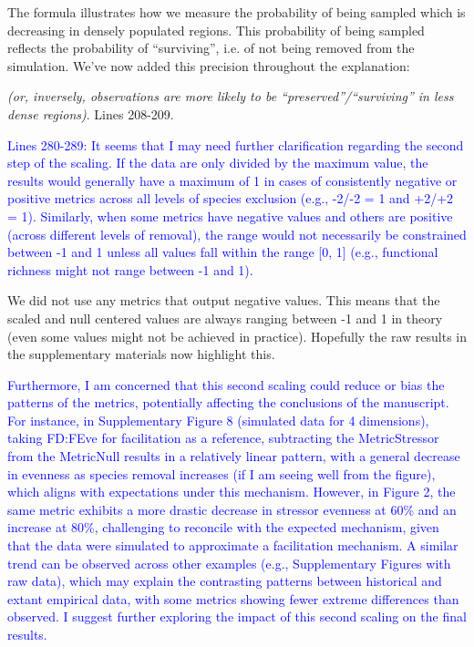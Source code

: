 \documentclass[
]{article}
\begin{document}
The formula illustrates how we measure the probability of being sampled which is decreasing in densely populated regions.
This probability of being sampled reflects the probability of ``surviving'', i.e. of not being removed from the simulation.
We've now added this precision throughout the explanation:

\textit{(or, inversely, observations are more likely to be ``preserved''/``surviving'' in less dense regions)}. Lines 208-209. %

\textcolor{blue}{Lines 280-289: It seems that I may need further clarification regarding the second step of the scaling.
If the data are only divided by the maximum value, the results would generally have a maximum of 1 in cases of consistently negative or positive metrics across all levels of species exclusion (e.g., -2/-2 = 1 and +2/+2 = 1).
Similarly, when some metrics have negative values and others are positive (across different levels of removal), the range would not necessarily be constrained between -1 and 1 unless all values fall within the range [0, 1] (e.g., functional richness might not range between -1 and 1).}

We did not use any metrics that output negative values.
This means that the scaled and null centered values are always ranging between -1 and 1 in theory (even some values might not be achieved in practice).
Hopefully the raw results in the supplementary materials now highlight this.

\textcolor{blue}{Furthermore, I am concerned that this second scaling could reduce or bias the patterns of the metrics, potentially affecting the conclusions of the manuscript.
For instance, in Supplementary Figure 8 (simulated data for 4 dimensions), taking FD:FEve for facilitation as a reference, subtracting the MetricStressor from the MetricNull results in a relatively linear pattern, with a general decrease in evenness as species removal increases (if I am seeing well from the figure), which aligns with expectations under this mechanism.
However, in Figure 2, the same metric exhibits a more drastic decrease in stressor evenness at 60\% and an increase at 80\%, challenging to reconcile with the expected mechanism, given that the data were simulated to approximate a facilitation mechanism.
A similar trend can be observed across other examples (e.g., Supplementary Figures with raw data), which may explain the contrasting patterns between historical and extant empirical data, with some metrics showing fewer extreme differences than observed.
I suggest further exploring the impact of this second scaling on the final results.}
\end{document}
